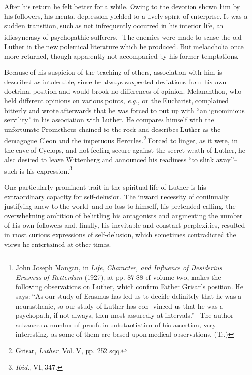 After his return he felt better for a while. Owing to the devotion
shown him by his followers, his mental depression yielded to a lively
spirit of enterprise. It was a sudden transition, such as not infrequently
occurred in his interior life, an idiosyncrasy of psychopathic sufferers.\footnote
{John Joseph Mangan, in \textit{Life, Character, and Influence of Desiderius Erasmus of
Rotterdam} (1927), at pp. 87-88 of volume two, makes the following observations on
Luther, which confirm Father Grisar’s position. He says: “As our study of Erasmus has
led us to decide definitely that he was a neurasthenic, so our study of Luther has con-
vinced us that he was a psychopath, if not always, then most assuredly at intervals.”--
The author advances a number of proofs in substantiation of his assertion,
very interesting, as some of them are based upon medical observations. (Tr.)}
The enemies were made to sense the old Luther in the new
polemical literature which he produced. But melancholia once more
returned, though apparently not accompanied by his former temptations.

Because of his suspicion of the teaching of others, association with
him is described as intolerable, since he always suspected deviations
from his own doctrinal position and would brook no differences of
opinion. Melanchthon, who held different opinions on various points,
\textit{e.g.}, on the Eucharist, complained bitterly and wrote afterwards that
he was forced to put up with “an ignominious servility” in his association
with Luther. He compares himself with the unfortunate
Prometheus chained to the rock and describes Luther as the demagogue
Cleon and the impetuous Hercules.\footnote{Grisar, \textit{Luther}, Vol. V, pp. 252 sqq.}
 Forced to linger, as it were, in
the cave of Cyclops, and not feeling secure against the secret wrath
of Luther, he also desired to leave Wittenberg and announced his
readiness “to slink away”--such is his expression.\footnote{\textit{Ibid.}, VI, 347.}

One particularly prominent trait in the spiritual life of Luther is
his extraordinary capacity for self-delusion. The inward necessity of
continually justifying anew to the world, and no less to himself, his
pretended calling, the overwhelming ambition of belittling his
antagonists and augmenting the number of his own followers and,
finally, his inevitable and constant perplexities, resulted in most curious
expressions of self-delusion, which sometimes contradicted the
views he entertained at other times.

